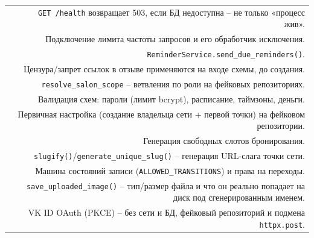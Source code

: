 \begin{xltabular}{\textwidth}{M D}
 & \texttt{GET /health} возвращает 503, если БД
  недоступна -- не только «процесс жив». \\
 & Подключение лимита частоты запросов и его
  обработчик исключения. \\
 & \texttt{ReminderService.send_due_reminders()}. \\
 & Цензура/запрет ссылок в отзыве
  применяются на входе схемы, до создания. \\
 & \texttt{resolve_salon_scope} --
  ветвления по роли на фейковых репозиториях. \\
 & Валидация схем: пароли (лимит bcrypt),
  расписание, таймзоны, деньги. \\
 & Первичная настройка (создание
  владельца сети + первой точки) на фейковом репозитории. \\
 & Генерация свободных слотов бронирования. \\
 & \texttt{slugify()}/\texttt{generate_unique_slug()}
  -- генерация URL-слага точки сети. \\
 & Машина состояний записи
  (\texttt{ALLOWED_TRANSITIONS}) и права на переходы. \\
 & \texttt{save_uploaded_image()} -- тип/размер
  файла и что он реально попадает на диск под сгенерированным именем. \\
 & VK ID OAuth (PKCE) -- без сети и
  БД, фейковый репозиторий и подмена \texttt{httpx.post}. \\
\end{xltabular}

